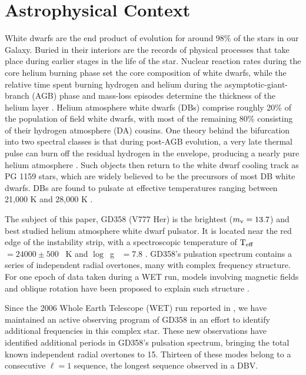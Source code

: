 \documentclass[12pt,preprint]{aastex}
\newcommand{\teff}{$\rm T_{eff}$}
\newcommand{\logg}{$\log$\ g }
\begin{document}
\section{Astrophysical Context}
\label{intro}
White dwarfs are the end product of evolution for around 98\% of the stars in our Galaxy. 
Buried in their interiors are the records of physical processes that take place during 
earlier stages in the life of the star. Nuclear reaction rates during the core helium 
burning phase set the core composition of white dwarfs, while the relative time spent 
burning hydrogen and helium during the asymptotic-giant-branch (AGB) phase and mass-loss 
episodes determine the thickness of the helium layer \citep{Lawlor06,Althaus05}. Helium 
atmosphere white dwarfs (DBs) comprise roughly 20\% of the population of field white 
dwarfs, with most of the remaining 80\% consisting of their hydrogen atmosphere (DA) 
cousins. One theory behind the bifurcation into two spectral classes is that during post-AGB evolution, a very late thermal pulse can burn off the residual hydrogen 
in the envelope, producing a nearly pure helium atmosphere \citep{Iben83}. Such objects 
then return to the white dwarf cooling track as PG 1159 stars, which are 
widely believed to be the precursors of most DB white dwarfs. DBs are found to pulsate at 
effective temperatures ranging between 21,000 K and 28,000 K \citep{Beauchamp99, Castanheira05}. 

The subject of this paper, GD358 (V777 Her) is the brightest ($m_{\rm v}=13.7$) and best 
studied helium atmosphere white dwarf pulsator. It is located near the red edge of the 
instability strip, with a spectroscopic temperature of \teff\ $=24000\pm500$ ~K and \logg\ $=7.8$ 
\citep{Nitta12, Koester2013}. GD358's pulsation spectrum contains a series of independent 
radial overtones, many with complex frequency structure.  For one epoch of data taken during a WET run, models involving magnetic fields and oblique rotation have been proposed to explain such structure \citep{Montgomery10}.

Since the 2006 Whole Earth Telescope (WET) run reported in \citet{Provencal09}, 
we have maintained an active observing program of GD358 in an effort to identify additional
frequencies in this complex star. These new observations have identified additional 
periods in GD358's pulsation spectrum, bringing the total known independent radial overtones to 15. Thirteen of 
these modes belong to a consecutive $\ell=1$ sequence, the longest sequence observed 
in a DBV. 
\end{document}
